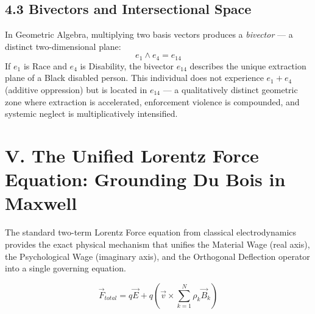 \documentclass[12pt]{book}
\numberwithin{equation}{chapter}
\begin{document}
\subsection{4.3 Bivectors and Intersectional Space}

    In Geometric Algebra, multiplying two basis vectors produces a \emph{bivector} — a distinct two-dimensional plane:
    \[
      e_1 \wedge e_4 = e_{14}
    \]
    If $e_1$ is Race and $e_4$ is Disability, the bivector $e_{14}$ describes the unique extraction plane of a Black disabled person. This individual does not experience $e_1 + e_4$ (additive oppression) but is located in $e_{14}$ — a qualitatively distinct geometric zone where extraction is accelerated, enforcement violence is compounded, and systemic neglect is multiplicatively intensified.
  

\section{V. The Unified Lorentz Force Equation: Grounding Du Bois in Maxwell}

    The standard two-term Lorentz Force equation from classical electrodynamics provides the exact physical mechanism that unifies the Material Wage (real axis), the Psychological Wage (imaginary axis), and the Orthogonal Deflection operator into a single governing equation.
  

\begin{equation}
 \vec{F}_{total} = q\vec{E} + q\left(\vec{v} \times \sum_{k=1}^{N} \rho_k \vec{B}_k\right) 
\label{eq:uef-lorentz-force}
\end{equation}
\end{document}

